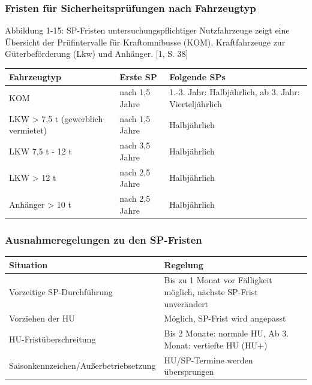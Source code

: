 \documentclass{vorlage-design-main}
\begin{document}
\subsubsection{Fristen für Sicherheitsprüfungen nach
Fahrzeugtyp}\label{fristen-fuer-sicherheitspruefungen-nach-fahrzeugtyp}

Abbildung 1-15: SP-Fristen untersuchungspflichtiger Nutzfahrzeuge zeigt
eine Übersicht der Prüfintervalle für Kraftomnibusse (KOM),
Kraftfahrzeuge zur Güterbeförderung (Lkw) und Anhänger. {[}1, S. 38{]}

\begin{table}[ht]
  \begin{tabular}{@{}lll@{}}
\toprule
Fahrzeugtyp
 &
Erste SP
 &
Folgende SPs
 \\
\midrule[\heavyrulewidth]
KOM & nach 1,5 Jahre & 1.-3. Jahr: Halbjährlich, ab 3. Jahr:
Vierteljährlich \\
LKW \textgreater{} 7,5 t (gewerblich vermietet) & nach 1,5 Jahre &
Halbjährlich \\
LKW 7,5 t - 12 t & nach 3,5 Jahre & Halbjährlich \\
LKW \textgreater{} 12 t & nach 2,5 Jahre & Halbjährlich \\
Anhänger \textgreater{} 10 t & nach 2,5 Jahre & Halbjährlich \\
\bottomrule
\end{tabular}%
\end{table}

\subsubsection{Ausnahmeregelungen zu den
SP-Fristen}\label{ausnahmeregelungen-zu-den-sp-fristen}

\begin{table}[ht]
  \begin{tabular}{@{}ll@{}}
\toprule
Situation
 &
Regelung
 \\
\midrule[\heavyrulewidth]
Vorzeitige SP-Durchführung & Bis zu 1 Monat vor Fälligkeit möglich,
nächste SP-Frist unverändert \\
Vorziehen der HU & Möglich, SP-Frist wird angepasst \\
HU-Fristüberschreitung & Bis 2 Monate: normale HU, Ab 3. Monat:
vertiefte HU (HU+) \\
Saisonkennzeichen/Außerbetriebsetzung & HU/SP-Termine werden
übersprungen \\
\bottomrule
\end{tabular}%
\end{table}
\end{document}
